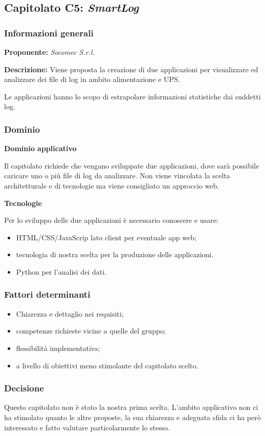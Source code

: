 \subsection{Capitolato C5: \textit{SmartLog}}

\subsubsection{Informazioni generali}

\textbf{Proponente:} \textit{Socomec S.r.l.}

\textbf{Descrizione:} Viene proposta la creazione di due applicazioni per visualizzare ed analizzare dei file di log in ambito alimentazione e UPS.

Le applicazioni hanno lo scopo di estrapolare informazioni statistiche dai suddetti log.

\subsubsection{Dominio}

\textbf{Dominio applicativo}

Il capitolato richiede che vengano sviluppate due applicazioni, dove sarà possibile caricare uno o più file di log da analizzare. Non viene vincolata la scelta architetturale e di tecnologie ma viene consigliato un approccio web.

\textbf{Tecnologie}

Per lo sviluppo delle due applicazioni è necessario conoscere e usare:
\begin{itemize}
    \item HTML/CSS/JavaScrip lato client per eventuale app web;
    \item tecnologia di nostra scelta per la produzione delle applicazioni.
    \item Python per l'analisi dei dati.
\end{itemize}

\subsubsection{Fattori determinanti}
\begin{itemize}
    \item Chiarezza e dettaglio nei requisiti;
    \item competenze richieste vicine a quelle del gruppo;
    \item flessibilità implementativa;
    \item a livello di obiettivi meno stimolante del capitolato scelto.
\end{itemize}

\subsubsection{Decisione}

Questo capitolato non è stato la nostra prima scelta. L'ambito applicativo non ci ha stimolato quanto le altre proposte, la sua chiarezza e adeguata sfida ci ha però interessato e fatto valutare particolarmente lo stesso.